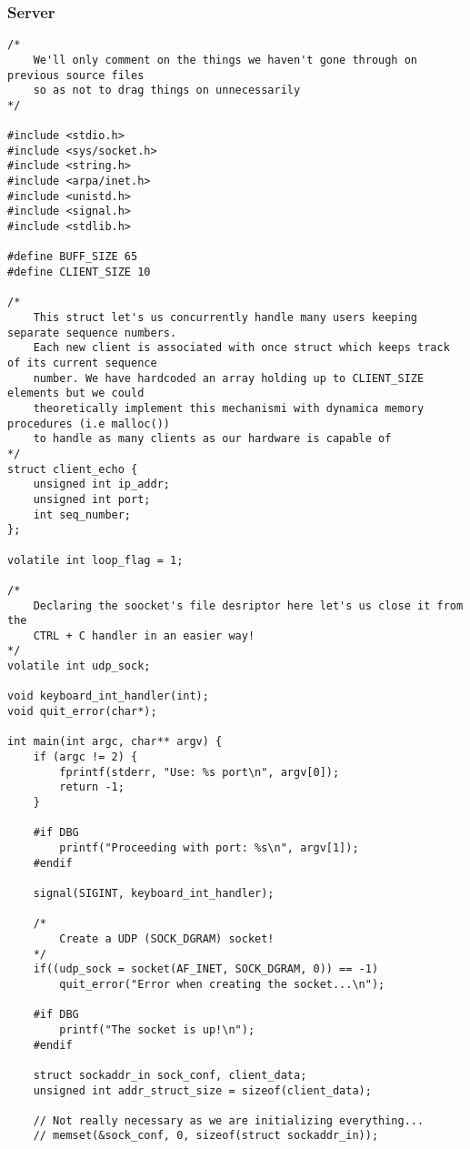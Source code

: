 \documentclass[landscape]{article}
\begin{document}
            \subsubsection{Server}
                \begin{verbatim}
/*
    We'll only comment on the things we haven't gone through on previous source files
    so as not to drag things on unnecessarily
*/

#include <stdio.h>
#include <sys/socket.h>
#include <string.h>
#include <arpa/inet.h>
#include <unistd.h>
#include <signal.h>
#include <stdlib.h>

#define BUFF_SIZE 65
#define CLIENT_SIZE 10

/*
    This struct let's us concurrently handle many users keeping separate sequence numbers.
    Each new client is associated with once struct which keeps track of its current sequence
    number. We have hardcoded an array holding up to CLIENT_SIZE elements but we could
    theoretically implement this mechanismi with dynamica memory procedures (i.e malloc())
    to handle as many clients as our hardware is capable of
*/
struct client_echo {
    unsigned int ip_addr;
    unsigned int port;
    int seq_number;
};

volatile int loop_flag = 1;

/*
    Declaring the soocket's file desriptor here let's us close it from the
    CTRL + C handler in an easier way!
*/
volatile int udp_sock;

void keyboard_int_handler(int);
void quit_error(char*);

int main(int argc, char** argv) {
    if (argc != 2) {
        fprintf(stderr, "Use: %s port\n", argv[0]);
        return -1;
    }

    #if DBG
        printf("Proceeding with port: %s\n", argv[1]);
    #endif

    signal(SIGINT, keyboard_int_handler);

    /*
        Create a UDP (SOCK_DGRAM) socket!
    */
    if((udp_sock = socket(AF_INET, SOCK_DGRAM, 0)) == -1)
        quit_error("Error when creating the socket...\n");

    #if DBG
        printf("The socket is up!\n");
    #endif

    struct sockaddr_in sock_conf, client_data;
    unsigned int addr_struct_size = sizeof(client_data);

    // Not really necessary as we are initializing everything...
    // memset(&sock_conf, 0, sizeof(struct sockaddr_in));


\end{verbatim}
\end{document}
